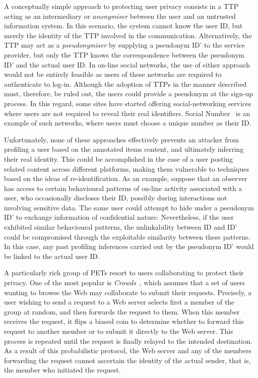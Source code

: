 A conceptually simple approach to protecting user privacy consists in a TTP acting as an intermediary or \emph{anonymiser} between the user and an untrusted information system. In this scenario, the system cannot know the user ID, but merely the identity of the TTP involved in the communication. Alternatively, the TTP may act as a \emph{pseudonymiser} by supplying a pseudonym ID' to the service provider, but only the TTP knows the correspondence between the pseudonym ID' and the actual user ID. In on-line social networks, the use of either approach would not be entirely feasible as users of these networks are required to authenticate to log-in. Although the adoption of TTPs in the manner described must, therefore, be ruled out, the users could provide a pseudonym at the sign-up process. In this regard, some sites have started offering social-networking services where users are not required to reveal their real identifiers. Social Number~\cite{SocialNumber} is an example of such networks, where users must choose a unique number as their ID.

Unfortunately, none of these approaches effectively prevents an attacker from profiling a user based on the annotated items content, and ultimately inferring their real identity. This could be accomplished in the case of a user posting related content across different platforms, making them vulnerable to techniques based on the ideas of re-identification. As an example, suppose that an observer has access to certain behavioural patterns of on-line activity associated with a user, who occasionally discloses their ID, possibly during interactions not involving sensitive data. The same user could attempt to hide under a pseudonym ID' to exchange information of confidential nature. Nevertheless, if the user exhibited similar behavioural patterns, the unlinkability between ID and ID' could be compromised through the exploitable similarity between these patterns. In this case, any past profiling inferences carried out by the pseudonym ID' would be linked to the actual user ID.

A particularly rich group of PETs resort to users collaborating to protect their privacy. One of the most popular is \emph{Crowds}~\cite{Reiter98ISS}, which assumes that a set of users wanting to browse the Web may collaborate to submit their requests. Precisely, a user wishing to send a request to a Web server selects first a member of the group at random, and then forwards the request to them. When this member receives the request, it flips a biased coin to determine whether to forward this request to another member or to submit it directly to the Web server. This process is repeated until the request is finally relayed to the intended destination. As a result of this probabilistic protocol, the Web server and any of the members forwarding the request cannot ascertain the identity of the actual sender, that is, the member who initiated the request.

